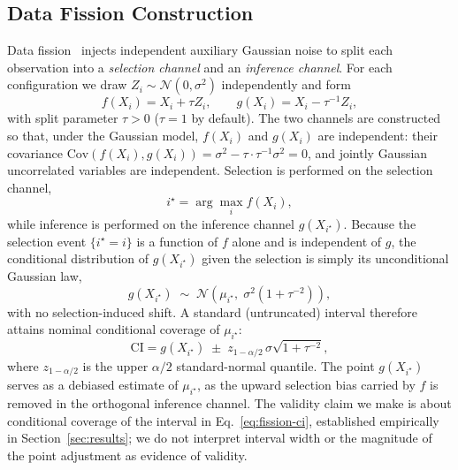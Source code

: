 \documentclass[conference]{IEEEtran}
\begin{document}
\subsection{Data Fission Construction}
Data fission~\cite{leiner2023datafission} injects independent auxiliary Gaussian noise to split each observation into a \emph{selection channel} and an \emph{inference channel}. For each configuration we draw $Z_i \sim \mathcal{N}(0, \sigma^2)$ independently and form
\begin{equation}
f(X_i) = X_i + \tau Z_i, \qquad
g(X_i) = X_i - \tau^{-1} Z_i ,
\end{equation}
with split parameter $\tau > 0$ ($\tau = 1$ by default). The two channels are constructed so that, under the Gaussian model, $f(X_i)$ and $g(X_i)$ are independent: their covariance $\mathrm{Cov}(f(X_i), g(X_i)) = \sigma^2 - \tau \cdot \tau^{-1} \sigma^2 = 0$, and jointly Gaussian uncorrelated variables are independent. Selection is performed on the selection channel,
\begin{equation}
i^\star = \arg\max_{i} f(X_i) ,
\end{equation}
while inference is performed on the inference channel $g(X_{i^\star})$. Because the selection event $\{i^\star = i\}$ is a function of $f$ alone and is independent of $g$, the conditional distribution of $g(X_{i^\star})$ given the selection is simply its unconditional Gaussian law,
\begin{equation}
g(X_{i^\star}) \;\sim\; \mathcal{N}\!\left(\mu_{i^\star},\; \sigma^2(1 + \tau^{-2})\right) ,
\end{equation}
with no selection-induced shift. A standard (untruncated) interval therefore attains nominal conditional coverage of $\mu_{i^\star}$:
\begin{equation}
\mathrm{CI} = g(X_{i^\star}) \;\pm\; z_{1-\alpha/2}\,\sigma\sqrt{1 + \tau^{-2}} ,
\label{eq:fission-ci}
\end{equation}
where $z_{1-\alpha/2}$ is the upper $\alpha/2$ standard-normal quantile. The point $g(X_{i^\star})$ serves as a debiased estimate of $\mu_{i^\star}$, as the upward selection bias carried by $f$ is removed in the orthogonal inference channel. The validity claim we make is about conditional coverage of the interval in Eq.~\eqref{eq:fission-ci}, established empirically in Section~\ref{sec:results}; we do not interpret interval width or the magnitude of the point adjustment as evidence of validity.
\end{document}
